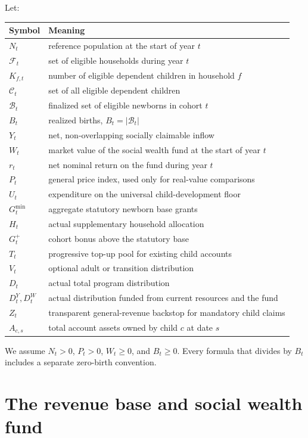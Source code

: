 \documentclass[11pt]{article}
\begin{document}
Let:

\begin{longtable}{>{\raggedright\arraybackslash}p{}p{}}
\toprule
Symbol & Meaning \\
\midrule
$N_t$ & reference population at the start of year $t$ \\
$\mathcal F_t$ & set of eligible households during year $t$ \\
$K_{f,t}$ & number of eligible dependent children in household $f$ \\
$\mathcal C_t$ & set of all eligible dependent children \\
$\mathcal B_t$ & finalized set of eligible newborns in cohort $t$ \\
$B_t$ & realized births, $B_t=|\mathcal B_t|$ \\
$Y_t$ & net, non-overlapping socially claimable inflow \\
$W_t$ & market value of the social wealth fund at the start of year $t$ \\
$r_t$ & net nominal return on the fund during year $t$ \\
$P_t$ & general price index, used only for real-value comparisons \\
$U_t$ & expenditure on the universal child-development floor \\
$G_t^{\min}$ & aggregate statutory newborn base grants \\
$H_t$ & actual supplementary household allocation \\
$G_t^{+}$ & cohort bonus above the statutory base \\
$T_t$ & progressive top-up pool for existing child accounts \\
$V_t$ & optional adult or transition distribution \\
$D_t$ & actual total program distribution \\
$D_t^Y,D_t^W$ & actual distribution funded from current resources and the fund \\
$Z_t$ & transparent general-revenue backstop for mandatory child claims \\
$A_{c,s}$ & total account assets owned by child $c$ at date $s$ \\
\bottomrule
\end{longtable}

We assume $N_t>0$, $P_t>0$, $W_t\ge 0$, and $B_t\ge 0$. Every formula that divides by
$B_t$ includes a separate zero-birth convention.

\section{The revenue base and social wealth fund}
\end{document}
